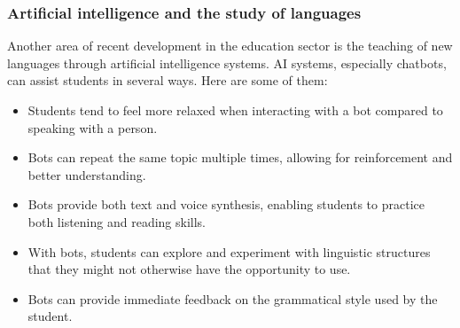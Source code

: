 \documentclass[a4paper,12pt]{article}
\begin{document}

\subsubsection{Artificial intelligence and the study of languages}
Another area of recent development in the education sector is the teaching of new languages through artificial intelligence systems. AI systems, especially chatbots, can assist students in several ways. Here are some of them\cite{haristiani2019artificial}:
\begin{itemize}
    \item Students tend to feel more relaxed when interacting with a bot compared to speaking with a person.
    \item Bots can repeat the same topic multiple times, allowing for reinforcement and better understanding.
    \item Bots provide both text and voice synthesis, enabling students to practice both listening and reading skills.
    \item With bots, students can explore and experiment with linguistic structures that they might not otherwise have the opportunity to use.
    \item Bots can provide immediate feedback on the grammatical style used by the student.
\end{itemize}
\end{document}
